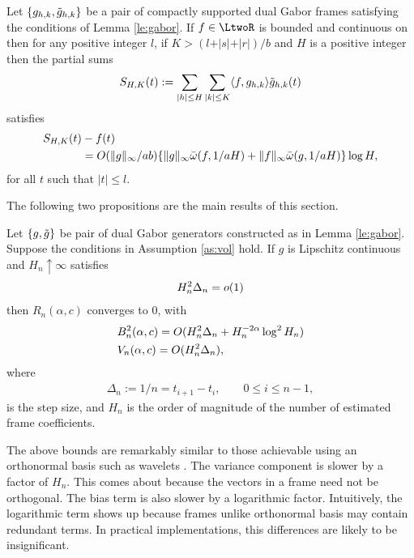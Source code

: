 \begin{thm} \label{th:fourone}
  Let $\{g_{h,k}, \tilde{g}_{h,k}\}$ be a pair of compactly supported dual Gabor frames satisfying the conditions of Lemma \eqref{le:gabor}. If $f \in \LtwoR$ is bounded and continuous on \real then for any positive integer $l$, if $K > (l + \vert s \vert + \vert r \vert)/ b$ and $H$ is a positive integer then  the partial sums 
  \begin{align}
    S_{H,K} (t) := \sum_{\vert h \vert \le H} \sum_{\vert k \vert \le K} \langle{f},{g_{h,k}}\rangle \tilde{g}_{h,k}(t)  \notag
    \label{}
  \end{align}
  satisfies
  \begin{align}
    S_{H,K} (t) & - f(t) \notag \\  &= O({\Vert g \Vert_{\infty}}/{ab}) \{ \Vert g \Vert_{\infty}{\bar{\omega}}({f},1/aH) + \Vert f \Vert_{\infty} {\bar{\omega}}({g},1/aH)\} \log H\notag, 
    \label{}
  \end{align}
for all $t$ such that $\vert t\vert \le l$.
\end{thm}
The following two propositions are the main results of this section.
\begin{prop} \label{pr:consistency}
  Let $\{g, \tilde{g}\}$ be pair of dual Gabor generators constructed as in Lemma \eqref{le:gabor}.   Suppose the conditions in  Assumption \ref{as:vol}  hold. If $g$ is Lipschitz continuous and $H_n \uparrow \infty$ satisfies  
  \begin{align}
    H_n^2 \Delta_n  = o(1) \notag
    \label{}
  \end{align}
   then $R_n(\alpha,c)$ converges to 0, with 
  \begin{align}
    & B_n^2(\alpha,c)  = O(H_n^2\Delta_n  + H_n^{-2\alpha} \log^2 H_n)\notag \\
    & V_n(\alpha,c)  = O(H_n^2 \Delta_n),
    \label{}
  \end{align}
  where  
  \begin{align}
    \Delta_n := 1/n = t_{i + 1}  - t_i,   \qquad 0 \le i \le n - 1,   
\end{align} is the step size, and $H_n$ is the order of magnitude of the number of estimated frame coefficients. 
\end{prop}
\begin{remark}\mbox{}
The above bounds are remarkably similar to those achievable using an orthonormal basis such as wavelets \citep{GenonCatalot1992}. The variance component is slower by a factor of $H_n$. This comes about because the vectors in a frame need not be orthogonal. The bias term is also  slower by a logarithmic factor. Intuitively, the logarithmic term shows up because frames unlike orthonormal basis may contain  redundant terms. In practical implementations, this differences are likely to be insignificant. 
\end{remark}
